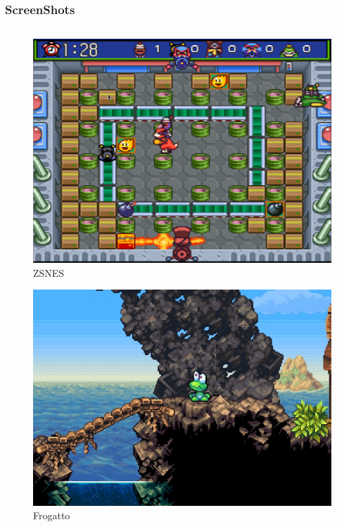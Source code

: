 \begin{frame}\frametitle{ScreenShots}

\begin{columns}
	\begin{column}{4cm}
	\begin{figure}
		\includegraphics[scale=0.18]{img/zsnes.png}
		\caption{ZSNES}
	\end{figure}
	
	\begin{figure}
		\includegraphics[scale=0.18]{img/frogatto.jpg}
		\caption{Frogatto}
	\end{figure}
	\end{column}
	

\end{columns}
\end{frame}
